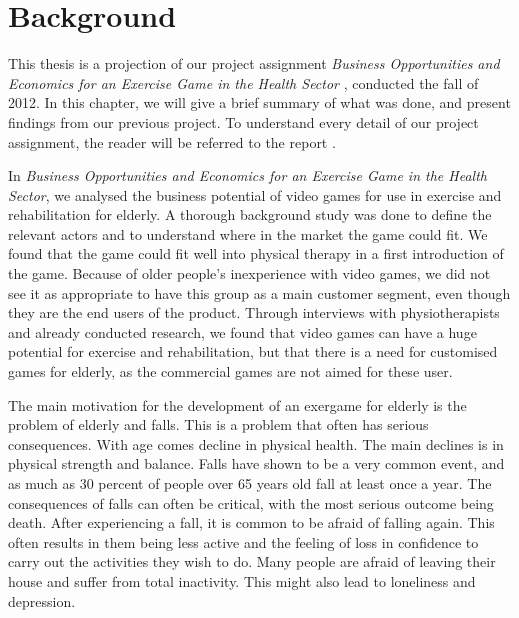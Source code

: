 \chapter{Background}
This thesis is a projection of our project assignment \emph{Business Opportunities and Economics for an Exercise Game in the Health Sector} \cite{project}, conducted the fall of 2012. In this chapter, we will give a brief summary of what was done, and present findings from our previous project. To understand every detail of our project assignment, the reader will be referred to the report \cite{project}. 

In \emph{Business Opportunities and Economics for an Exercise Game in the Health Sector}, we analysed the business potential of video games for use in exercise and rehabilitation for elderly. A thorough background study was done to define the relevant actors and to understand where in the market the game could fit. We found that the game could fit well into physical therapy in a first introduction of the game. Because of older people's inexperience with video games, we did not see it as appropriate to have this group as a main customer segment, even though they are the end users of the product. Through interviews with physiotherapists and already conducted research, we found that video games can have a huge potential for exercise and rehabilitation, but that there is a need for customised games for elderly, as the commercial games are not aimed for these user. 

The main motivation for the development of an exergame for elderly is the problem of elderly and falls. This is a problem that often has serious consequences. With age comes decline in physical health. The main declines is in physical strength and balance. Falls have shown to be a very common event, and as much as 30 percent of people over 65 years old fall at least once a year. The consequences of falls can often be critical, with the most serious outcome being death. After experiencing a fall, it is common to be afraid of falling again. This often results in them being less active and the feeling of loss in confidence to carry out the activities they wish to do. Many people are afraid of leaving their house and suffer from total inactivity. This might also lead to loneliness and depression. 

